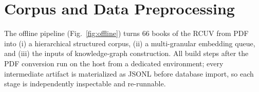 
\section{Corpus and Data Preprocessing}
\label{sec:preprocessing}

The offline pipeline (Fig.~\ref{fig:offline}) turns 66 books of the RCUV
from PDF into (i) a hierarchical structured corpus, (ii) a multi-granular
embedding queue, and (iii) the inputs of knowledge-graph construction. All
build steps after the PDF conversion run on the host from a dedicated
 environment;
every intermediate artifact is materialized as JSONL before database
import, so each stage is independently inspectable and re-runnable.


